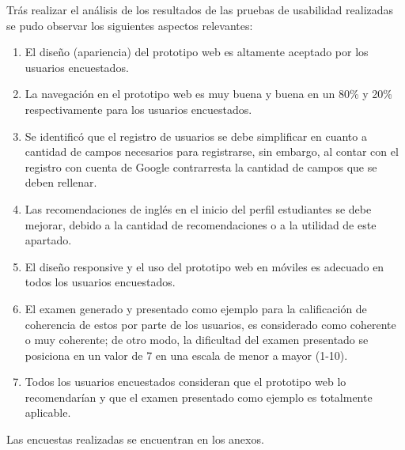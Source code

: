 \documentclass[../Main.tex]{subfiles}
\begin{document}
    \begin{justify}
    Trás realizar el análisis de los resultados de las pruebas de usabilidad realizadas se pudo observar los siguientes aspectos relevantes:
    
    \begin{enumerate}
        \item El diseño (apariencia) del prototipo web es altamente aceptado por los usuarios encuestados.
        \item La navegación en el prototipo web es muy buena y buena en un 80\% y 20\% respectivamente para los usuarios encuestados.
        \item Se identificó que el registro de usuarios se debe simplificar en cuanto a cantidad de campos necesarios para registrarse, sin embargo, al contar con el registro con cuenta de Google contrarresta la cantidad de campos que se deben rellenar.
        \item Las recomendaciones de inglés en el inicio del perfil estudiantes se debe mejorar, debido a la cantidad de recomendaciones o a la utilidad de este apartado.
        \item El diseño responsive y el uso del prototipo web en móviles es adecuado en todos los usuarios encuestados.
        \item El examen generado y presentado como ejemplo para la calificación de coherencia de estos por parte de los usuarios, es considerado como coherente o muy coherente; de otro modo, la dificultad del examen presentado se posiciona en un valor de 7 en una escala de menor a mayor (1-10).
        \item Todos los usuarios encuestados consideran que el prototipo web lo recomendarían y que el examen presentado como ejemplo es totalmente aplicable.
    \end{enumerate}
    \end{justify}
    
    \begin{justify}
        Las encuestas realizadas se encuentran en los anexos.
    \end{justify}
\end{document}
